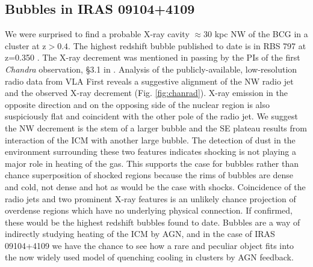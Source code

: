 \documentclass[letterpaper,11pt,twocolumn]{article}
\begin{document}
\subsection{Bubbles in IRAS 09104+4109}
We were surprised to find a probable X-ray
cavity $\approx 30$ kpc NW of the BCG in a cluster
at z$ > 0.4$. The highest redshift bubble published to date is in
RBS 797 at z=0.350 \cite{2001A&A...376L..27S}. The X-ray decrement
was mentioned in passing by the PIs of the first {\textit{Chandra}}
observation, \S{3.1} in \cite{2001MNRAS.321L..15I}. Analysis of the
publicly-available, low-resolution
radio data from VLA First reveals a suggestive alignment of the NW radio
jet and the observed X-ray decrement (Fig. \ref{fig:chanrad}). X-ray
emission in the opposite direction and on the opposing side of the nuclear
region is also suspiciously flat and coincident with the other pole of
the radio jet. We suggest the NW decrement is the
stem of a larger bubble and the SE plateau results from interaction of
the ICM with another large bubble. The
detection of dust
in the environment surrounding these two features
indicates shocking is not playing a major role in heating of the
gas. This supports the case for bubbles rather than chance superposition of
shocked regions because the rims of bubbles
are dense and cold, not dense and hot as would be the case with shocks.
Coincidence of the radio jets and two prominent X-ray features is
an unlikely chance projection of overdense regions which have no
underlying physical connection.
If confirmed, these would be the highest redshift bubbles found to
date. Bubbles are a way of indirectly studying
heating of the ICM by AGN, and in the case of IRAS 09104+4109 we
have the chance to see how a rare and peculiar object fits into the
now widely used model of quenching cooling in clusters by AGN feedback.
\end{document}
